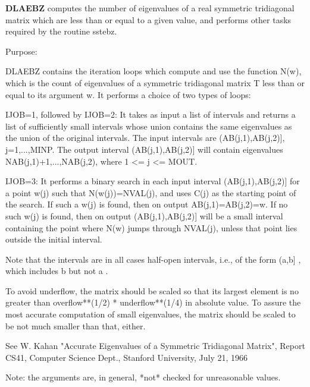 {\bfseries D\+L\+A\+E\+B\+Z} computes the number of eigenvalues of a real symmetric tridiagonal matrix which are less than or equal to a given value, and performs other tasks required by the routine sstebz. 

 \begin{DoxyParagraph}{Purpose\+: }
\begin{DoxyVerb} DLAEBZ contains the iteration loops which compute and use the
 function N(w), which is the count of eigenvalues of a symmetric
 tridiagonal matrix T less than or equal to its argument  w.  It
 performs a choice of two types of loops:

 IJOB=1, followed by
 IJOB=2: It takes as input a list of intervals and returns a list of
         sufficiently small intervals whose union contains the same
         eigenvalues as the union of the original intervals.
         The input intervals are (AB(j,1),AB(j,2)], j=1,...,MINP.
         The output interval (AB(j,1),AB(j,2)] will contain
         eigenvalues NAB(j,1)+1,...,NAB(j,2), where 1 <= j <= MOUT.

 IJOB=3: It performs a binary search in each input interval
         (AB(j,1),AB(j,2)] for a point  w(j)  such that
         N(w(j))=NVAL(j), and uses  C(j)  as the starting point of
         the search.  If such a w(j) is found, then on output
         AB(j,1)=AB(j,2)=w.  If no such w(j) is found, then on output
         (AB(j,1),AB(j,2)] will be a small interval containing the
         point where N(w) jumps through NVAL(j), unless that point
         lies outside the initial interval.

 Note that the intervals are in all cases half-open intervals,
 i.e., of the form  (a,b] , which includes  b  but not  a .

 To avoid underflow, the matrix should be scaled so that its largest
 element is no greater than  overflow**(1/2) * underflow**(1/4)
 in absolute value.  To assure the most accurate computation
 of small eigenvalues, the matrix should be scaled to be
 not much smaller than that, either.

 See W. Kahan "Accurate Eigenvalues of a Symmetric Tridiagonal
 Matrix", Report CS41, Computer Science Dept., Stanford
 University, July 21, 1966

 Note: the arguments are, in general, *not* checked for unreasonable
 values.\end{DoxyVerb}
 
\end{DoxyParagraph}

